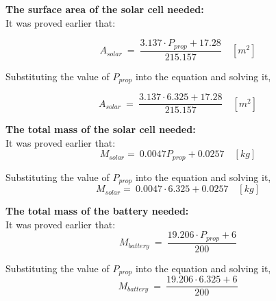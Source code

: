 \p \textbf{The surface area of the solar cell needed:} \vspace{0.1cm}\\
It was proved earlier that:

\[ A_{solar} \ = \ \frac{ 3.137 \cdot P_{prop} + 17.28 }{ 215.157 } \quad [m^2] \]

Substituting the value of $ P_{prop} $ into the equation and solving it,

\[ A_{solar} \ = \ \frac{ 3.137 \cdot 6.325 + 17.28 }{ 215.157 } \quad [m^2] \]
\boxfour

\vspace{1cm}

\p \textbf{The total mass of the solar cell needed:} \vspace{0.1cm}\\
It was proved earlier that:
\[ M_{solar} = \ 0.0047 P_{prop} + 0.0257  \quad [kg] \]

Substituting the value of $ P_{prop} $ into the equation and solving it,
\[ M_{solar} = \ 0.0047 \cdot 6.325 + 0.0257  \quad [kg] \]
\boxfive

\vspace{1cm}

\p \textbf{The total mass of the battery needed:} \vspace{0.1cm}\\
It was proved earlier that:
\[ M_{battery} \ = \ \frac{ 19.206 \cdot P_{prop} + 6 }{ 200 } \]

Substituting the value of $ P_{prop} $ into the equation and solving it,
\[ M_{battery} \ = \ \frac{ 19.206 \cdot 6.325 + 6 }{ 200 } \]
\boxsix
